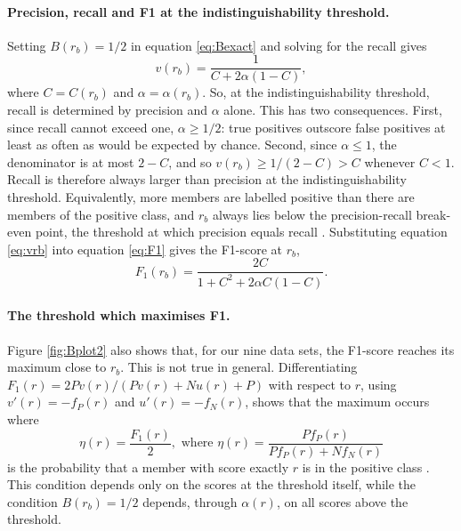 \documentclass[preprint,12pt]{article}
\begin{document}
\paragraph{Precision, recall and F1 at the indistinguishability threshold.} Setting $B(r_b)=1/2$ in equation \ref{eq:Bexact} and solving for the recall gives
\begin{equation}
v(r_b) = \frac{1}{C + 2\alpha(1-C)} ,  \label{eq:vrb}
\end{equation}
where $C=C(r_b)$ and $\alpha=\alpha(r_b)$. So, at the indistinguishability threshold, recall is determined by precision and $\alpha$ alone. This has two consequences. First, since recall cannot exceed one, $\alpha \geq 1/2$: true positives outscore false positives at least as often as would be expected by chance. Second, since $\alpha \leq 1$, the denominator is at most $2-C$, and so $v(r_b) \geq 1/(2-C) > C$ whenever $C<1$. Recall is therefore always larger than precision at the indistinguishability threshold. Equivalently, more members are labelled positive than there are members of the positive class, and $r_b$ always lies below the precision-recall break-even point, the threshold at which precision equals recall \cite{manning2008introduction}. Substituting equation \ref{eq:vrb} into equation \ref{eq:F1} gives the F1-score at $r_b$,
\begin{equation}
F_1(r_b) = \frac{2C}{1 + C^2 + 2\alpha C (1-C)} .  \label{eq:F1atrb}
\end{equation}

\paragraph{The threshold which maximises F1.} Figure \ref{fig:Bplot2} also shows that, for our nine data sets, the F1-score reaches its maximum close to $r_b$. This is not true in general. Differentiating $F_1(r) = 2 P v(r) / (P v(r) + N u(r) + P)$ with respect to $r$, using $v'(r) = -f_P(r)$ and $u'(r) = -f_N(r)$, shows that the maximum occurs where
\begin{equation}
\eta(r) = \frac{F_1(r)}{2}, \mbox{ where } \eta(r) = \frac{P f_P(r)}{P f_P(r) + N f_N(r)}  \label{eq:F1max}
\end{equation}
is the probability that a member with score exactly $r$ is in the positive class \cite{lipton2014optimal}. This condition depends only on the scores at the threshold itself, while the condition $B(r_b)=1/2$ depends, through $\alpha(r)$, on all scores above the threshold.
\end{document}
